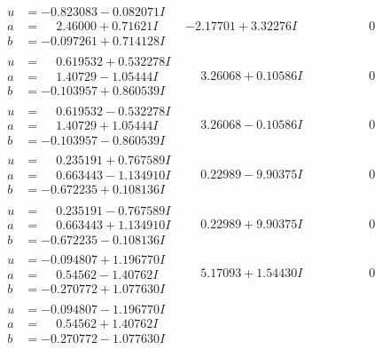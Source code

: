 \documentclass[1p]{elsarticle_modified}
\theoremstyle{definition}
\begin{document}
$$\begin{array}{c|c|c}
\begin{aligned}
u &= -0.823083 - 0.082071 I \\
a &= \phantom{-}2.46000 + 0.71621 I \\
b &= -0.097261 + 0.714128 I\end{aligned}
 & -2.17701 + 3.32276 I & \phantom{-0.000000 } 0 \\ \hline\begin{aligned}
u &= \phantom{-}0.619532 + 0.532278 I \\
a &= \phantom{-}1.40729 - 1.05444 I \\
b &= -0.103957 + 0.860539 I\end{aligned}
 & \phantom{-}3.26068 + 0.10586 I & \phantom{-0.000000 } 0 \\ \hline\begin{aligned}
u &= \phantom{-}0.619532 - 0.532278 I \\
a &= \phantom{-}1.40729 + 1.05444 I \\
b &= -0.103957 - 0.860539 I\end{aligned}
 & \phantom{-}3.26068 - 0.10586 I & \phantom{-0.000000 } 0 \\ \hline\begin{aligned}
u &= \phantom{-}0.235191 + 0.767589 I \\
a &= \phantom{-}0.663443 - 1.134910 I \\
b &= -0.672235 + 0.108136 I\end{aligned}
 & \phantom{-}0.22989 - 9.90375 I & \phantom{-0.000000 } 0 \\ \hline\begin{aligned}
u &= \phantom{-}0.235191 - 0.767589 I \\
a &= \phantom{-}0.663443 + 1.134910 I \\
b &= -0.672235 - 0.108136 I\end{aligned}
 & \phantom{-}0.22989 + 9.90375 I & \phantom{-0.000000 } 0 \\ \hline\begin{aligned}
u &= -0.094807 + 1.196770 I \\
a &= \phantom{-}0.54562 - 1.40762 I \\
b &= -0.270772 + 1.077630 I\end{aligned}
 & \phantom{-}5.17093 + 1.54430 I & \phantom{-0.000000 } 0 \\ \hline\begin{aligned}
u &= -0.094807 - 1.196770 I \\
a &= \phantom{-}0.54562 + 1.40762 I \\
b &= -0.270772 - 1.077630 I\end{aligned}

\end{array}$$
\end{document}
